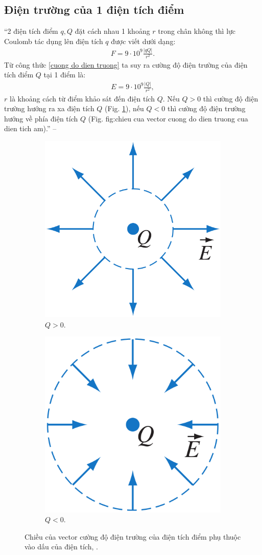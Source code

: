 \documentclass[oneside]{book}
\numberwithin{equation}{section}
\begin{document}
\subsection{Điện trường của 1 điện tích điểm}
``2 điện tích điểm $q,Q$ đặt cách nhau 1 khoảng $r$ trong chân không thì lực Coulomb tác dụng lên điện tích $q$ được viết dưới dạng:
\begin{align*}
	F = 9\cdot 10^9\frac{|qQ|}{r^2}.
\end{align*}
Từ công thức \eqref{cuong do dien truong} ta suy ra cường độ điện trường của điện tích điểm $Q$ tại 1 điểm là:
\begin{align}
	\label{cuong do dien truong 2}
	E = 9\cdot 10^9\frac{|Q|}{r^2},
\end{align}
$r$ là khoảng cách từ điểm khảo sát đến điện tích $Q$. Nếu $Q > 0$ thì cường độ điện trường hướng ra xa điện tích $Q$ (Fig. \ref{fig:chieu cua vector cuong do dien truong cua dien tich duong}), nếu $Q < 0$ thì cường độ điện trường hướng về phía điện tích $Q$ (Fig. {fig:chieu cua vector cuong do dien truong cua dien tich am}).'' -- \cite[pp. 16--17]{SGK_Vat_Ly_11_nang_cao}

\begin{figure}[H]
	\centering
	\begin{subfigure}{.5\textwidth}
		\centering
		\includegraphics[width=.35\linewidth]{chieu_cua_vector_cuong_do_dien_truong_cua_dien_tich_diem_duong}
		\caption{$Q > 0$.}
		\label{fig:chieu cua vector cuong do dien truong cua dien tich duong}
	\end{subfigure}%
	\begin{subfigure}{.5\textwidth}
		\centering
		\includegraphics[width=.35\linewidth]{chieu_cua_vector_cuong_do_dien_truong_cua_dien_tich_diem_am}
		\caption{$Q < 0$.}
		\label{fig:chieu cua vector cuong do dien truong cua dien tich am}
	\end{subfigure}
	\caption{Chiều của vector cường độ điện trường của điện tích điểm phụ thuộc vào dấu của điện tích, \cite[Hình 3.9, p. 17]{SGK_Vat_Ly_11_nang_cao}.}
	\label{fig:chieu cua vector cuong do dien truong cua dien tich}
\end{figure}
\end{document}
